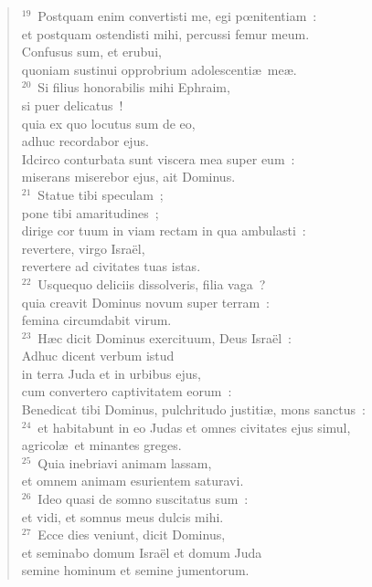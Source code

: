 \begin{flushleft}
\begin{verse}
${}^{19}$~Postquam enim convertisti me, egi pœnitentiam~:\\ et postquam ostendisti mihi, percussi femur meum.\\ Confusus sum, et erubui,\\ quoniam sustinui opprobrium adolescenti\ae\ me\ae .\\
${}^{20}$~Si filius honorabilis mihi Ephraim,\\ si puer delicatus~!\\ quia ex quo locutus sum de eo,\\ adhuc recordabor ejus.\\ Idcirco conturbata sunt viscera mea super eum~:\\ miserans miserebor ejus, ait Dominus.\\
${}^{21}$~Statue tibi speculam~;\\ pone tibi amaritudines~;\\ dirige cor tuum in viam rectam in qua ambulasti~:\\ revertere, virgo Isra\"el,\\ revertere ad civitates tuas istas.\\
${}^{22}$~Usquequo deliciis dissolveris, filia vaga~?\\ quia creavit Dominus novum super terram~:\\ femina circumdabit virum.\\
${}^{23}$~H\ae c dicit Dominus exercituum, Deus Isra\"el~:\\ Adhuc dicent verbum istud\\ in terra Juda et in urbibus ejus,\\ cum convertero captivitatem eorum~:\\ Benedicat tibi Dominus, pulchritudo justiti\ae , mons sanctus~:\\
${}^{24}$~et habitabunt in eo Judas et omnes civitates ejus simul,\\ agricol\ae\ et minantes greges.\\
${}^{25}$~Quia inebriavi animam lassam,\\ et omnem animam esurientem saturavi.\\
${}^{26}$~Ideo quasi de somno suscitatus sum~:\\ et vidi, et somnus meus dulcis mihi.\\
${}^{27}$~Ecce dies veniunt, dicit Dominus,\\ et seminabo domum Isra\"el et domum Juda\\ semine hominum et semine jumentorum.\\

\end{verse}
\end{flushleft}
